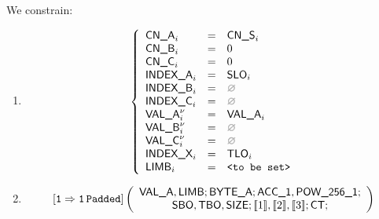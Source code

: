 \begin{center}
\end{center}

We constrain:
\begin{enumerate}
	\item 
		\[
			\left\{ \begin{array}{lclr}
				\cnA      _{i}       & = & \cnS_{i}      \\
				\cnB      _{i}       & = & 0             \\
				\cnC      _{i}       & = & 0             \\
				\indexA   _{i}       & = & \slo_{i}      \\
				\indexB   _{i}       & = & \nothing      \\
				\indexC   _{i}       & = & \nothing      \\
				\valA     _{i}\new{} & = & \valA_{i}     \\
				\valB     _{i}\new{} & = & \nothing      \\
				\valC     _{i}\new{} & = & \nothing      \\
				\indexX   _{i}       & = & \tlo_{i}      \\
				\limb     _{i}       & = & \valueToBeSet \\
			\end{array} \right.
		\]
	\item 
		\[
			\operatorname{\mathtt{[1\Rightarrow1\,Padded]}}
			\left( \begin{array}{c}
				\textsf{VAL\_A}{}, \textsf{LIMB}{}; \textsf{BYTE\_A}{}; \textsf{ACC}\textsf{\_1}, \textsf{POW\_256\_1}; \\
				\textsf{SBO}{}, \textsf{TBO}{}, \textsf{SIZE}{}; [\![1]\!], [\![2]\!], [\![3]\!]; \textsf{CT}{}; \\
			\end{array} \right)
		\]
\end{enumerate}
